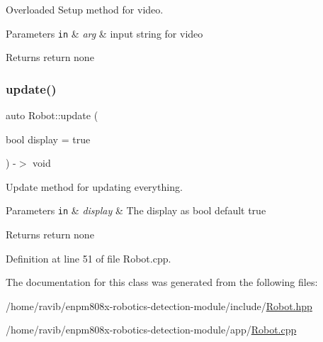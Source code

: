 Overloaded Setup method for video. 


\begin{DoxyParams}[1]{Parameters}
\mbox{\tt in}  & {\em arg} & input string for video\\
\hline
\end{DoxyParams}
\begin{DoxyReturn}{Returns}
return none 
\end{DoxyReturn}
\mbox{\label{class_robot_aaec2f96af2ff3dc26c34535903c7baaf}} 
\subsubsection{\texorpdfstring{update()}{update()}}
{\footnotesize\ttfamily auto Robot\+::update (\begin{DoxyParamCaption}\item[{bool}]{display = {\ttfamily true} }\end{DoxyParamCaption}) -\/$>$ void}



Update method for updating everything. 


\begin{DoxyParams}[1]{Parameters}
\mbox{\tt in}  & {\em display} & The display as bool default true\\
\hline
\end{DoxyParams}
\begin{DoxyReturn}{Returns}
return none 
\end{DoxyReturn}


Definition at line 51 of file Robot.\+cpp.



The documentation for this class was generated from the following files\+:\begin{DoxyCompactItemize}
\item 
/home/ravib/enpm808x-\/robotics-\/detection-\/module/include/\hyperlink{_robot_8hpp}{Robot.\+hpp}\item 
/home/ravib/enpm808x-\/robotics-\/detection-\/module/app/\hyperlink{_robot_8cpp}{Robot.\+cpp}\end{DoxyCompactItemize}
